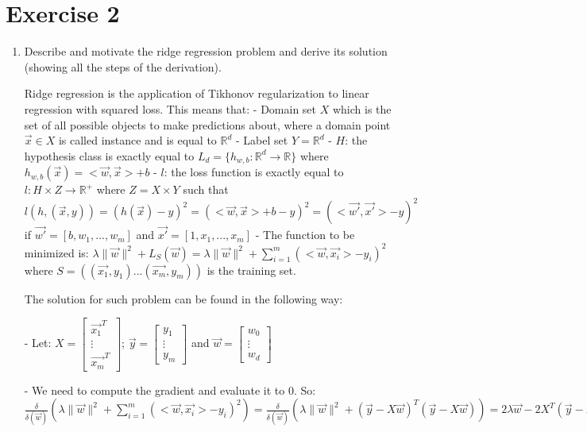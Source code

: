 \documentclass[a4paper,11pt,oneside]{book}
\begin{document}
\clearpage
\section{Exercise 2}
\begin{enumerate}
    \item Describe and motivate the ridge regression problem and derive its solution (showing all the steps of the derivation).
        \begin{solution}
            Ridge regression is the application of Tikhonov regularization to linear regression with squared loss. This means that:
            - Domain set $X$ which is the set of all possible objects to make predictions about, where a domain point $\vec{x} \in X$ is called instance and is equal to $\mathbb{R}^d$
            - Label set $Y = \mathbb{R}^d$  
            - $H$: the hypothesis class is exactly equal to $L_d = \{h_{w,b}:\mathbb{R}^d \to \mathbb{R}\}$ where $h_{w,b}(\vec{x}) = <\vec{w},\vec{x}> + b$
            - $l$: the loss function is exactly equal to $l: H\times Z \to \mathbb{R}^+$ where $Z = X\times Y$ such that $l(h,(\vec{x},y)) = (h(\vec{x})-y)^2 = (<\vec{w},\vec{x}>+b - y)^2 = (<\vec{w'},\vec{x'}>-y)^2$ if $\vec{w'} = [b,w_1,...,w_m]$ and $\vec{x'} = [1,x_1,...,x_m]$
            - The function to be minimized is: $\lambda\|\vec{w}\|^2 + L_S(\vec{w}) = \lambda\|\vec{w}\|^2 + \sum_{i=1}^m(<\vec{w},\vec{x_i}>-y_i)^2$ where $S = ((\vec{x_1},y_1)...(\vec{x_m},y_m))$ is the training set.
            
            The solution for such problem can be found in the following way:
            
            - Let: $X = \begin{bmatrix} \vec{x_1}^T \\ \vdots \\ \vec{x_m}^T \end{bmatrix}$; $\vec{y} = \begin{bmatrix} y_1 \\ \vdots \\ y_m \end{bmatrix}$ and $\vec{w} = \begin{bmatrix} w_0 \\ \vdots \\ w_d \end{bmatrix}$
            
            - We need to compute the gradient and evaluate it to 0. So: $\frac{\delta}{\delta(\vec{w})}(\lambda\|\vec{w}\|^2 + \sum_{i=1}^m(<\vec{w},\vec{x_i}>-y_i)^2) = \frac{\delta}{\delta(\vec{w})}(\lambda\|\vec{w}\|^2 + (\vec{y}-X\vec{w})^T(\vec{y}-X\vec{w})) = 2\lambda\vec{w} - 2X^T(\vec{y}-X\vec{w})$
            

\end{solution}
\end{enumerate}
\end{document}
